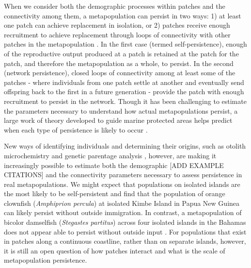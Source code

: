 \documentclass[12pt, oneside]{article}   	%
\begin{document}
When we consider both the demographic processes within patches and the connectivity among them, a metapopulation can persist in two ways: 1) at least one patch can achieve replacement in isolation, or 2) patches receive enough recruitment to achieve replacement through loops of connectivity with other patches in the metapopulation \citep{hastings_persistence_2006, burgess2014beyond}. In the first case (termed self-persistence), enough of the reproductive output produced at a patch is retained at the patch for the patch, and therefore the metapopulation as a whole, to persist. In the second (network persistence), closed loops of connectivity among at least some of the patches - where individuals from one patch settle at another and eventually send offspring back to the first in a future generation - provide the patch with enough recruitment to persist in the network. Though it has been challenging to estimate the parameters necessary to understand how actual metapopulations persist, a large work of theory developed to guide marine protected areas helps predict when each type of persistence is likely to occur \citep[i.e.\ large patches relative to the mean dispersal distance are likely to be self-persistent,][]{botsford_dependence_2001}. %

New ways of identifying individuals and determining their origins, such as otolith microchemistry and genetic parentage analysis \citep[e.g.][]{wang2004sibship, wang2014estimation}, however, are making it increasingly possible to estimate both the demographic [ADD EXAMPLE CITATIONS] and the connectivity \citep[e.g.][]{hameed2016inverse, almany2017larval} parameters necessary to assess persistence in real metapopulations. We might expect that populations on isolated islands are the most likely to be self-persistent and \cite{salles_coral_2015} find that the population of orange clownfish (\textit{Amphiprion percula}) at isolated Kimbe Island in Papua New Guinea can likely persist without outside immigration. In contrast, a metapopulation of bicolor damselfish (\textit{Stegastes partitus}) across four isolated islands in the Bahamas does not appear able to persist without outside input \citep{johnson2018integrating}. For populations that exist in patches along a continuous coastline, rather than on separate islands, however, it is still an open question of how patches interact and what is the scale of metapopulation persistence.
\end{document}
